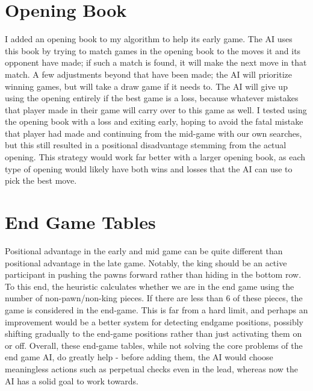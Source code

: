 \documentclass[10pt]{article}
\begin{document}
\section{Opening Book}
I added an opening book to my algorithm to help its early game. The AI uses this book by trying to match games in the opening book to the moves it and its opponent have made; if such a match is found, it will make the next move in that match. A few adjustments beyond that have been made; the AI will prioritize winning games, but will take a draw game if it needs to. The AI will give up using the opening entirely if the best game is a loss, because whatever mistakes that player made in their game will carry over to this game as well. I tested using the opening book with a loss and exiting early, hoping to avoid the fatal mistake that player had made and continuing from the mid-game with our own searches, but this still resulted in a positional disadvantage stemming from the actual opening. This strategy would work far better with a larger opening book, as each type of opening would likely have both wins and losses that the AI can use to pick the best move. 

\section{End Game Tables}

Positional advantage in the early and mid game can be quite different than positional advantage in the late game. Notably, the king should be an active participant in pushing the pawns forward rather than hiding in the bottom row. To this end, the heuristic calculates whether we are in the end game using the number of non-pawn/non-king pieces. If there are less than 6 of these pieces, the game is considered in the end-game. This is far from a hard limit, and perhaps an improvement would be a better system for detecting endgame positions, possibly shifting gradually to the end-game positions rather than just activating them on or off. Overall, these end-game tables, while not solving the core problems of the end game AI, do greatly help - before adding them, the AI would choose meaningless actions such as perpetual checks even in the lead, whereas now the AI has a solid goal to work towards.
\end{document}
